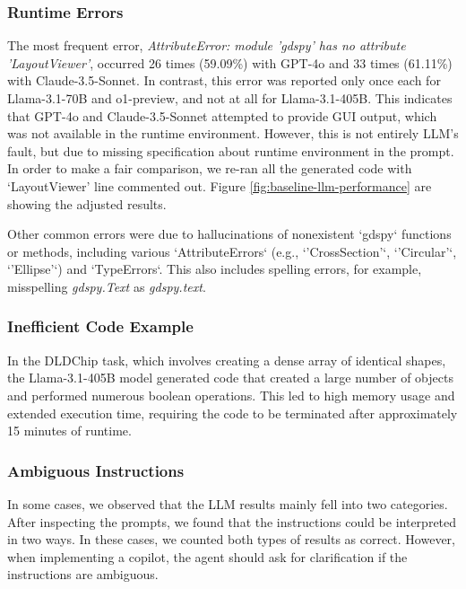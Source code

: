 \documentclass{article}
\begin{document}
\subsubsection{Runtime Errors}
\label{appendix:runtime_errors}

The most frequent error, \textit{AttributeError: module 'gdspy' has no attribute 'LayoutViewer'}, occurred 26 times (59.09\%) with GPT-4o and 33 times (61.11\%) with Claude-3.5-Sonnet. In contrast, this error was reported only once each for Llama-3.1-70B and o1-preview, and not at all for Llama-3.1-405B. This indicates that GPT-4o and Claude-3.5-Sonnet attempted to provide GUI output, which was not available in the runtime environment. However, this is not entirely LLM's fault, but due to missing specification about runtime environment in the prompt. In order to make a fair comparison, we re-ran all the generated code with `LayoutViewer' line commented out. Figure \ref{fig:baseline-llm-performance} are showing the adjusted results. 

Other common errors were due to hallucinations of nonexistent `gdspy` functions or methods, including various `AttributeErrors` (e.g., `'CrossSection'`, `'Circular'`, `'Ellipse'`) and `TypeErrors`. This also includes spelling errors, for example, misspelling \textit{gdspy.Text} as \textit{gdspy.text}.

\subsubsection{Inefficient Code Example}
\label{appendix:inefficient_code}

In the DLDChip task, which involves creating a dense array of identical shapes, the Llama-3.1-405B model generated code that created a large number of objects and performed numerous boolean operations. This led to high memory usage and extended execution time, requiring the code to be terminated after approximately 15 minutes of runtime.

\subsubsection{Ambiguous Instructions}
\label{appendix:ambiguous_instructions}

In some cases, we observed that the LLM results mainly fell into two categories. After inspecting the prompts, we found that the instructions could be interpreted in two ways. In these cases, we counted both types of results as correct. However, when implementing a copilot, the agent should ask for clarification if the instructions are ambiguous.
\end{document}
